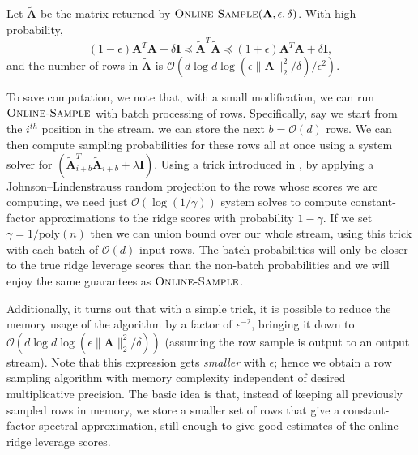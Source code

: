 \documentclass{toc}
\newcommand{\Oh}{\ensuremath{\mathcal{O}}}
\newcommand{\bv}[1]{\mathbf{#1}}
\newcommand{\norm}[1]{\|#1\|}
\newcommand{\poly}[1]{\text{poly}(#1)}
\begin{document}
\begin{theorem}
    \label{thm:online-sample}
    Let $\bv{\tilde{A}}$ be the matrix returned by $\textsc{Online-Sample}(\bv{A}, \epsilon, \delta)$.
    With high probability,
    $$
        (1-\epsilon)\bv{A}^T\bv{A} - \delta\bv{I} \preceq \bv{\tilde{A}}^T\bv{\tilde{A}} \preceq (1+\epsilon)\bv{A}^T\bv{A} + \delta\bv{I},
    $$
    and the number of rows in $\bv{\tilde{A}}$ is $\Oh(d \log d \log(\epsilon\norm{\bv{A}}_2^2/\delta)/\epsilon^2)$.
\end{theorem}

To save computation, we note that, with a small modification, we can run $\textsc{Online-Sample}$ with batch processing of rows. Specifically, say we start from the $i^{th}$ position in the stream. we can store the next $b=\Oh(d)$ rows. We can then compute sampling probabilities for these rows all at once using a system solver for $(\bv{\tilde A}_{i + b}^T \bv{\tilde A}_{i + b} + \lambda \bv{I})$. Using a trick introduced in \cite{spielman2011graph}, by applying a Johnson--Lindenstrauss random projection to the rows whose scores we are computing, we need just $\Oh(\log(1/\gamma))$ system solves to compute constant-factor approximations to the ridge scores with probability $1-\gamma$. If we set $\gamma = 1/\poly{n}$ then we can union bound over our whole stream, using this trick with each batch of $\Oh(d)$ input rows.
The batch probabilities will only be closer to the true ridge leverage scores than the non-batch probabilities and we will enjoy the same guarantees as $\textsc{Online-Sample}$.

Additionally, it turns out that with a simple trick, it is possible to reduce the memory usage of the algorithm by a factor of $\epsilon^{-2}$,
bringing it down to $\Oh(d \log d \log(\epsilon\norm{\bv A}_2^2/\delta))$ (assuming the row sample is output to an output stream).
Note that this expression gets \emph{smaller} with $\epsilon$; hence we obtain a row sampling algorithm with memory complexity independent of desired multiplicative precision. The basic idea is that, instead of keeping all previously sampled rows in memory, we store a smaller set of rows that give a constant-factor spectral approximation, still enough to give good estimates of the online ridge leverage scores.
\end{document}
